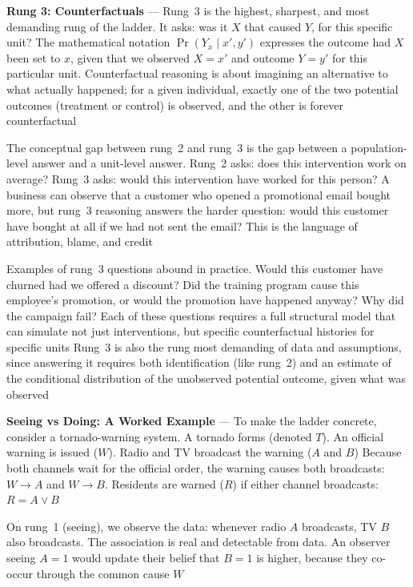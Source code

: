 \textbf{Rung 3: Counterfactuals} --- Rung~3 is the highest, sharpest, and most demanding
rung of the ladder. It asks: was it $X$ that caused $Y$, for this specific unit?
The mathematical notation $\Pr(Y_{x}\mid x', y')$ expresses the outcome had $X$ been
set to $x$, given that we observed $X = x'$ and outcome $Y = y'$ for this
particular unit. Counterfactual reasoning is about imagining an alternative to what
actually happened; for a given individual, exactly one of the two potential outcomes
(treatment or control) is observed, and the other is forever counterfactual

The conceptual gap between rung~2 and rung~3 is the gap between a population-level
answer and a unit-level answer. Rung~2 asks: does this intervention work on average?
Rung~3 asks: would this intervention have worked for this person? A business can
observe that a customer who opened a promotional email bought more, but rung~3 reasoning
answers the harder question: would this customer have bought at all if we had
not sent the email? This is the language of attribution, blame, and credit

Examples of rung~3 questions abound in practice. Would this customer have churned
had we offered a discount? Did the training program cause this employee's
promotion, or would the promotion have happened anyway? Why did the campaign
fail? Each of these questions requires a full structural model that can simulate
not just interventions, but specific counterfactual histories for specific units
Rung~3 is also the rung most demanding of data and assumptions, since answering it
requires both identification (like rung~2) and an estimate of the conditional distribution
of the unobserved potential outcome, given what was observed

\textbf{Seeing vs Doing: A Worked Example} --- To make the ladder concrete, consider
a tornado-warning system. A tornado forms (denoted $T$). An official warning is issued
($W$). Radio and TV broadcast the warning ($A$ and $B$) Because both channels
wait for the official order, the warning causes both broadcasts: $W \to A$ and
$W \to B$. Residents are warned ($R$) if either channel broadcasts:
$R = A \lor B$

On rung~1 (seeing), we observe the data: whenever radio $A$ broadcasts, TV $B$
also broadcasts. The association is real and detectable from data. An observer
seeing $A = 1$ would update their belief that $B = 1$ is higher, because they co-occur
through the common cause $W$


